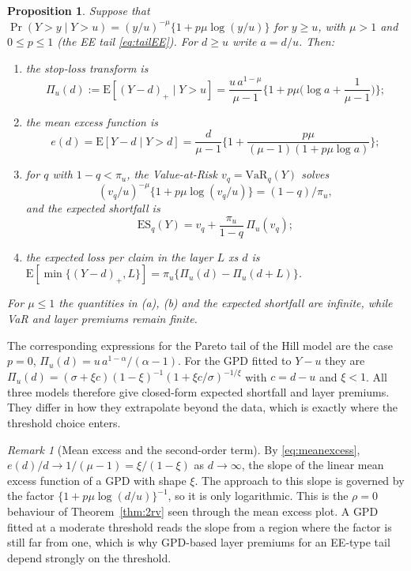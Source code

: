 \documentclass[12pt]{article}
\newtheorem{proposition}[theorem]{Proposition}
\theoremstyle{definition}
\theoremstyle{remark}
\newtheorem{remark}[theorem]{Remark}
\newcommand{\E}{\mathrm{E}}
\newcommand{\VaR}{\mathrm{VaR}}
\begin{document}
\begin{proposition}\label{prop:risk}
Suppose that $\Pr(Y>y\mid Y>u)=(y/u)^{-\mu}\{1+p\mu\log(y/u)\}$ for $y\ge u$, with $\mu>1$ and $0\le p\le1$ (the EE tail \eqref{eq:tailEE}). For $d\ge u$ write $a=d/u$. Then:
\begin{enumerate}
\item[(a)] the stop-loss transform is
\begin{equation}\label{eq:stoploss}
\Pi_u(d):=\E[(Y-d)_+\mid Y>u]=\frac{u\,a^{1-\mu}}{\mu-1}\Big\{1+p\mu\Big(\log a+\frac1{\mu-1}\Big)\Big\};
\end{equation}
\item[(b)] the mean excess function is
\begin{equation}\label{eq:meanexcess}
e(d)=\E[Y-d\mid Y>d]=\frac{d}{\mu-1}\Big\{1+\frac{p\mu}{(\mu-1)(1+p\mu\log a)}\Big\};
\end{equation}
\item[(c)] for $q$ with $1-q<\pi_u$, the Value-at-Risk $v_q=\VaR_q(Y)$ solves
\[
(v_q/u)^{-\mu}\{1+p\mu\log(v_q/u)\}=(1-q)/\pi_u ,
\]
and the expected shortfall is
\begin{equation}\label{eq:es}
\mathrm{ES}_q(Y)=v_q+\frac{\pi_u}{1-q}\,\Pi_u(v_q);
\end{equation}
\item[(d)] the expected loss per claim in the layer $L$ xs $d$ is $\E[\min\{(Y-d)_+,L\}]=\pi_u\{\Pi_u(d)-\Pi_u(d+L)\}$.
\end{enumerate}
For $\mu\le1$ the quantities in (a), (b) and the expected shortfall are infinite, while VaR and layer premiums remain finite.
\end{proposition}

The corresponding expressions for the Pareto tail of the Hill model are the case $p=0$, $\Pi_u(d)=u\,a^{1-\alpha}/(\alpha-1)$. For the GPD fitted to $Y-u$ they are $\Pi_u(d)=(\sigma+\xi c)(1-\xi)^{-1}(1+\xi c/\sigma)^{-1/\xi}$ with $c=d-u$ and $\xi<1$. All three models therefore give closed-form expected shortfall and layer premiums. They differ in how they extrapolate beyond the data, which is exactly where the threshold choice enters.

\begin{remark}[Mean excess and the second-order term]\label{rem:me}
By \eqref{eq:meanexcess}, $e(d)/d\to1/(\mu-1)=\xi/(1-\xi)$ as $d\to\infty$, the slope of the linear mean excess function of a GPD with shape $\xi$. The approach to this slope is governed by the factor $\{1+p\mu\log(d/u)\}^{-1}$, so it is only logarithmic. This is the $\rho=0$ behaviour of Theorem~\ref{thm:2rv} seen through the mean excess plot. A GPD fitted at a moderate threshold reads the slope from a region where the factor is still far from one, which is why GPD-based layer premiums for an EE-type tail depend strongly on the threshold.
\end{remark}
\end{document}
